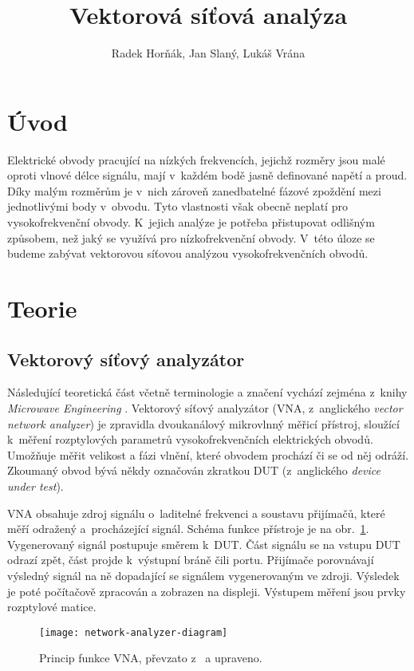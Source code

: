 \documentclass{protokol}
\title{Vektorová síťová analýza}
\author{Radek Horňák, Jan Slaný, Lukáš Vrána}
\begin{document}
\headernoenv

\section{Úvod}
Elektrické obvody pracující na nízkých frekvencích,
jejichž rozměry jsou malé oproti vlnové délce signálu,
mají v~každém bodě jasně definované napětí a proud.
Díky malým rozměrům je v~nich zároveň zanedbatelné fázové zpoždění
mezi jednotlivými body v~obvodu.
Tyto vlastnosti však obecně neplatí pro vysokofrekvenční obvody.
K~jejich analýze je potřeba přistupovat odlišným způsobem,
než jaký se využívá pro nízkofrekvenční obvody.
V~této úloze se budeme zabývat vektorovou síťovou analýzou vysokofrekvenčních obvodů.

\section{Teorie}

\subsection{Vektorový síťový analyzátor}

Následující teoretická část včetně terminologie a značení vychází zejména
z~knihy \emph{Microwave Engineering} \cite{pozar}.
Vektorový síťový analyzátor (VNA, z~anglického \emph{vector network analyzer})
je zpravidla dvoukanálový mikrovlnný měřicí přístroj,
sloužící k~měření rozptylových parametrů vysokofrekvenčních elektrických obvodů.
Umožňuje měřit velikost a fázi vlnění, které obvodem prochází
či se od něj odráží.
Zkoumaný obvod bývá někdy označován zkratkou DUT
(z~anglického \emph{device under test}).

VNA obsahuje zdroj signálu o~laditelné frekvenci a soustavu přijímačů,
které měří odražený a~procházející signál.
Schéma funkce přístroje je na obr.~\ref{VNA}.
Vygenerovaný signál postupuje směrem k~DUT.
Část signálu se na vstupu DUT odrazí zpět, část projde k~výstupní bráně čili portu.
Přijímače porovnávají výsledný signál na ně dopadající
se signálem vygenerovaným ve zdroji.
Výsledek je poté počítačově zpracován a zobrazen na displeji.
Výstupem měření jsou prvky rozptylové matice.

\begin{figure}[b]
	\centering
	\texttt{[image: network-analyzer-diagram]}
	\caption{Princip funkce VNA, převzato z~\cite{tektronix} a upraveno.}
	\label{VNA}
\end{figure}
\end{document}
